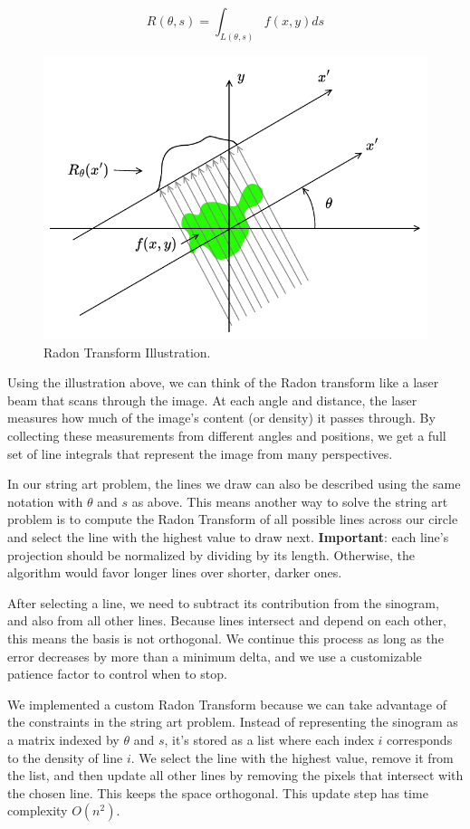 \begin{equation}  
R(\theta, s) = \int_{L(\theta, s)} f(x, y)ds
\end{equation}

\begin{figure}[H]
    \centering
    \includegraphics[width=0.6\linewidth]{images/radon.pdf}
    \caption{Radon Transform Illustration.}
    \label{fig:radon_illustration}
\end{figure}

Using the illustration above, we can think of the Radon transform like a laser beam that scans through the image. At each angle and distance, the laser measures how much of the image’s content (or density) it passes through. By collecting these measurements from different angles and positions, we get a full set of line integrals that represent the image from many perspectives.

In our string art problem, the lines we draw can also be described using the same notation with \(\theta\) and \(s\) as above. This means another way to solve the string art problem is to compute the Radon Transform of all possible lines across our circle and select the line with the highest value to draw next. \textbf{Important}: each line’s projection should be normalized by dividing by its length. Otherwise, the algorithm would favor longer lines over shorter, darker ones.

After selecting a line, we need to subtract its contribution from the sinogram, and also from all other lines. Because lines intersect and depend on each other, this means the basis is not orthogonal. We continue this process as long as the error decreases by more than a minimum delta, and we use a customizable patience factor to control when to stop.

We implemented a custom Radon Transform because we can take advantage of the constraints in the string art problem. Instead of representing the sinogram as a matrix indexed by \(\theta\) and \(s\), it’s stored as a list where each index \(i\) corresponds to the density of line \(i\). We select the line with the highest value, remove it from the list, and then update all other lines by removing the pixels that intersect with the chosen line. This keeps the space orthogonal. This update step has time complexity \(O(n^2)\).

